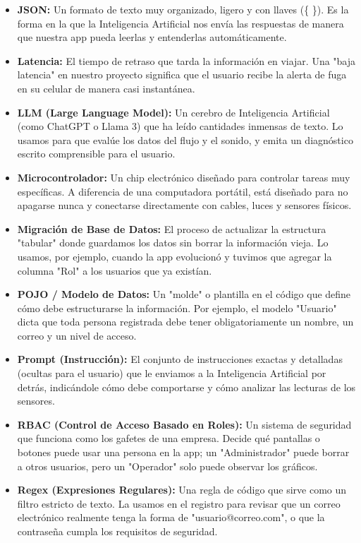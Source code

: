 \documentclass[11pt,a4paper]{article}
\begin{document}
\begin{itemize}
    \item \textbf{JSON:} Un formato de texto muy organizado, ligero y con llaves (\{ \}). Es la forma en la que la Inteligencia Artificial nos envía las respuestas de manera que nuestra app pueda leerlas y entenderlas automáticamente.
    \item \textbf{Latencia:} El tiempo de retraso que tarda la información en viajar. Una "baja latencia" en nuestro proyecto significa que el usuario recibe la alerta de fuga en su celular de manera casi instantánea.
    \item \textbf{LLM (Large Language Model):} Un cerebro de Inteligencia Artificial (como ChatGPT o Llama 3) que ha leído cantidades inmensas de texto. Lo usamos para que evalúe los datos del flujo y el sonido, y emita un diagnóstico escrito comprensible para el usuario.
    \item \textbf{Microcontrolador:} Un chip electrónico diseñado para controlar tareas muy específicas. A diferencia de una computadora portátil, está diseñado para no apagarse nunca y conectarse directamente con cables, luces y sensores físicos.
    \item \textbf{Migración de Base de Datos:} El proceso de actualizar la estructura "tabular" donde guardamos los datos sin borrar la información vieja. Lo usamos, por ejemplo, cuando la app evolucionó y tuvimos que agregar la columna "Rol" a los usuarios que ya existían.
    \item \textbf{POJO / Modelo de Datos:} Un "molde" o plantilla en el código que define cómo debe estructurarse la información. Por ejemplo, el modelo "Usuario" dicta que toda persona registrada debe tener obligatoriamente un nombre, un correo y un nivel de acceso.
    \item \textbf{Prompt (Instrucción):} El conjunto de instrucciones exactas y detalladas (ocultas para el usuario) que le enviamos a la Inteligencia Artificial por detrás, indicándole cómo debe comportarse y cómo analizar las lecturas de los sensores.
    \item \textbf{RBAC (Control de Acceso Basado en Roles):} Un sistema de seguridad que funciona como los gafetes de una empresa. Decide qué pantallas o botones puede usar una persona en la app; un "Administrador" puede borrar a otros usuarios, pero un "Operador" solo puede observar los gráficos.
    \item \textbf{Regex (Expresiones Regulares):} Una regla de código que sirve como un filtro estricto de texto. La usamos en el registro para revisar que un correo electrónico realmente tenga la forma de "usuario@correo.com", o que la contraseña cumpla los requisitos de seguridad.

\end{itemize}
\end{document}
